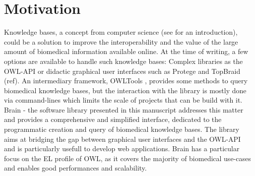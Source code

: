 \documentclass{bioinfo}
\begin{document}
\section{Motivation}
Knowledge bases, a concept from computer science (see \citealp{Krotzsch2012} for an introduction),
could be a solution to improve the interoperability and the value of the large amount of biomedical information available online.
At the time of writing, a few options are available to handle such knowledge bases: Complex
libraries as the OWL-API \citep{MatthewHorridge2011} or didactic graphical user interfaces such as
Protege \citep{StanfordCenterforBiomedicalInformaticsResearch} and TopBraid (ref). An intermediary framework,
OWLTools \citep{MungallC},
provides some methods to query biomedical knowledge bases, but the interaction with the library is mostly done via command-lines which
limits the scale of projects that can be build with it.
Brain - the software library presented in this manuscript addresses this matter and provides a comprehensive and simplified
interface, dedicated to the programmatic creation and query of biomedical knowledge bases. The library aims at bridging the gap between
graphical user interfaces and the OWL-API and is particularly usefull to develop web applications.
Brain has a particular focus on the EL profile of OWL, as it covers the majority of biomedical
use-cases and enables good performances and scalability. 
\end{document}
